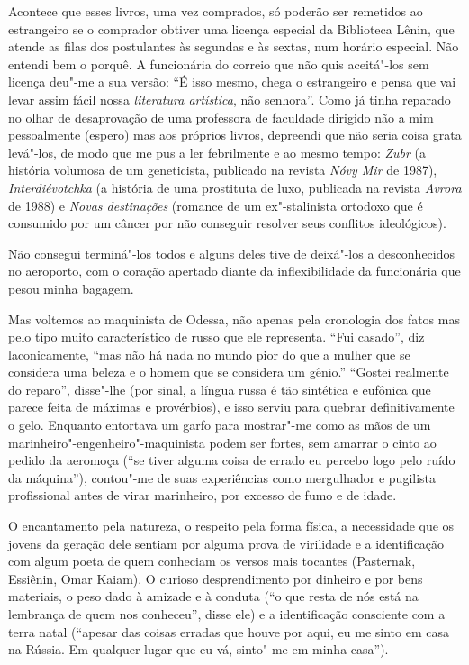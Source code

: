 Acontece que esses livros, uma vez comprados, só poderão ser remetidos ao estrangeiro se o comprador obtiver uma licença especial da Biblioteca Lênin, que atende as filas dos postulantes às segundas e às sextas, num horário especial. Não entendi bem o porquê. A funcionária do correio que não quis aceitá"-los sem licença deu"-me a sua versão: ``É isso mesmo, chega o estrangeiro e pensa que vai levar assim fácil nossa \emph{literatura artística}, não senhora''. Como já tinha reparado no olhar de desaprovação de uma professora de faculdade dirigido não a mim pessoalmente (espero) mas aos próprios livros, depreendi que não seria coisa grata levá"-los, de modo que me pus a ler febrilmente e ao mesmo tempo: \emph{Zubr} (a história volumosa de um geneticista, publicado na revista \emph{Nóvy Mir} de 1987), \emph{Interdiévotchka} (a história de uma prostituta de luxo, publicada na revista \emph{Avrora} de 1988) e \emph{Novas destinações} (romance de um ex"-stalinista ortodoxo que é consumido por um câncer por não conseguir resolver seus conflitos ideológicos).

Não consegui terminá"-los todos e alguns deles tive de deixá"-los a desconhecidos no aeroporto, com o coração apertado diante da
inflexibilidade da funcionária que pesou minha bagagem.

Mas voltemos ao maquinista de Odessa, não apenas pela cronologia dos fatos mas pelo tipo muito característico de russo que ele representa. ``Fui casado'', diz laconicamente, ``mas não há nada no mundo pior do que a mulher que se considera uma beleza e o homem que se considera um gênio.'' ``Gostei realmente do reparo'', disse"-lhe (por sinal, a língua russa é tão sintética e eufônica que parece feita de máximas e provérbios), e isso serviu para quebrar definitivamente o gelo. Enquanto entortava um garfo para mostrar"-me como as mãos de um marinheiro"-engenheiro"-maquinista podem ser fortes, sem amarrar o cinto ao pedido da aeromoça (``se tiver alguma coisa de errado eu percebo logo pelo ruído da máquina''), contou"-me de suas experiências como mergulhador e pugilista profissional antes de virar marinheiro, por excesso de fumo e de idade.

O encantamento pela natureza, o respeito pela forma física, a necessidade que os jovens da geração dele sentiam por alguma prova de
virilidade e a identificação com algum poeta de quem conheciam os versos mais tocantes (Pasternak, Essiênin, Omar Kaiam). O curioso
desprendimento por dinheiro e por bens materiais, o peso dado à amizade e à conduta (``o que resta de nós está na lembrança de quem nos conheceu'', disse ele) e a identificação consciente com a terra natal (``apesar das coisas erradas que houve por aqui, eu me sinto em casa na Rússia. Em qualquer lugar que eu vá, sinto"-me em minha casa'').

